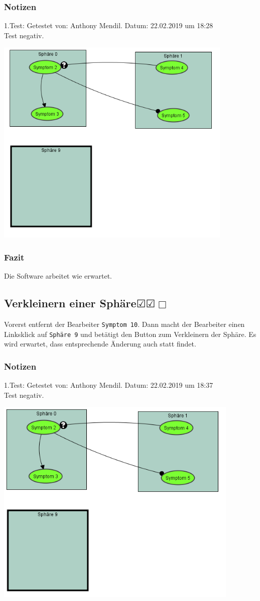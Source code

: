 \documentclass{scrartcl}
\newcommand{\subsectiont}[2]{\subsection[#1]{#1{\normalsize\normalfont #2}}}
\newcommand{\leer}{$\Box$}
\newcommand{\ok}{$\CheckedBox$}
\begin{document}
\subsubsection{Notizen}
1.Test: Getestet von: Anthony Mendil. Datum: 22.02.2019 um 18:28 \\
Test negativ.
\begin{center}
\includegraphics[height=10cm]{2_12.PNG}
\end{center}
\subsubsection{Fazit}
Die Software arbeitet wie erwartet. 

\subsectiont{Verkleinern einer Sphäre}{\dotfill\ok\ok\leer}
Vorerst entfernt der Bearbeiter \texttt{Symptom 10}. Dann macht der Bearbeiter einen Linksklick auf \texttt{Sphäre 9} und betätigt den Button zum Verkleinern der Sphäre. Es wird erwartet, dass entsprechende Änderung auch statt findet. 
\subsubsection{Notizen}
1.Test: Getestet von: Anthony Mendil. Datum: 22.02.2019 um 18:37 \\
Test negativ.
\begin{center}
\includegraphics[height=10cm]{2_13.PNG}
\end{center}
\end{document}
